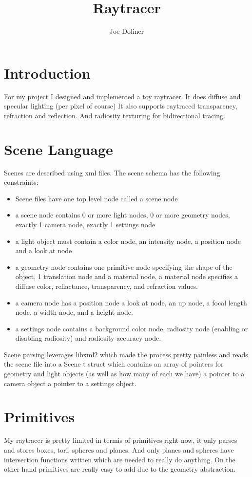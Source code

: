\documentclass{article}
\begin{document}
\title{Raytracer}
\author{Joe Doliner}

\maketitle

\section{Introduction}
For my project I designed and implemented a toy raytracer. It does diffuse and specular lighting (per pixel of course) It also supports raytraced transparency, refraction and reflection. And radiosity texturing for bidirectional tracing.

\section{Scene Language}
Scenes are described using xml files. The scene schema has the following constraints:
\begin{itemize}
\item Scene files have one top level node called a scene node
\item a scene node contains 0 or more light nodes, 0 or more geometry nodes, exactly 1 camera node, exactly 1 settings node
\item a light object must contain a color node, an intensity node, a position node and a look at node
\item a geometry node contains one primitive node specifying the shape of the object, 1 translation node and a material node, a material node specifies a diffuse color, reflactance, transparency, and refraction values.
\item a camera node has a position node a look at node, an up node, a focal length node, a width node, and a height node.
\item a settings node contains a background color node, radiosity node (enabling or disabling radiosity) and radiosity accuracy node.
\end{itemize}

    Scene parsing leverages libxml2 which made the process pretty painless and reads the scene file into a Scene t struct which contains an array of pointers for geometry and light objects (as well as how many of each we have) a pointer to a camera object a pointer to a settings object.

\section{Primitives}
My raytracer is pretty limited in termis of primitives right now, it only parses and stores boxes, tori, spheres and planes. And only planes and spheres have intersection functions written which are needed to really do anything. On the other hand primitives are really easy to add due to the geometry abstraction.
\end{document}

